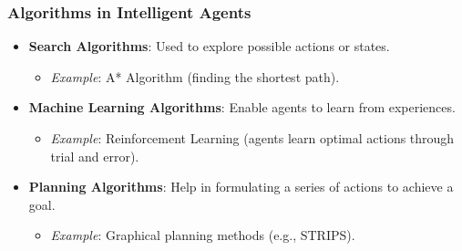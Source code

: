 \documentclass[aspectratio=169]{beamer}
\begin{document}
\begin{frame}
    \frametitle{Algorithms in Intelligent Agents}
    \begin{itemize}
        \item \textbf{Search Algorithms}: Used to explore possible actions or states.
        \begin{itemize}
            \item \textit{Example}: A* Algorithm (finding the shortest path).
        \end{itemize}
        
        \item \textbf{Machine Learning Algorithms}: Enable agents to learn from experiences.
        \begin{itemize}
            \item \textit{Example}: Reinforcement Learning (agents learn optimal actions through trial and error).
        \end{itemize}
        
        \item \textbf{Planning Algorithms}: Help in formulating a series of actions to achieve a goal.
        \begin{itemize}
            \item \textit{Example}: Graphical planning methods (e.g., STRIPS).
        \end{itemize}
    \end{itemize}
\end{frame}
\end{document}
